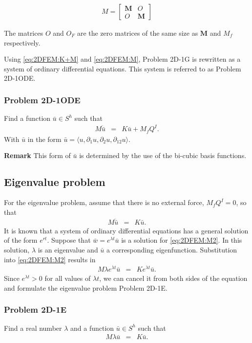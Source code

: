 \documentclass[../../main.tex]{subfiles}
\begin{document}
\begin{eqnarray}
	M = 
	\begin{bmatrix}
		\mathbf{M} & O \\
		O & \mathbf{M}
	\end{bmatrix}\label{eq:2DFEM:M}
\end{eqnarray}

The matrices ${O}$ and ${O_F}$ are the zero matrices of the same size as $\mathbf{M}$ and ${M_f}$ respectively.

Using \eqref{eq:2DFEM:K+M} and \eqref{eq:2DFEM:M}, Problem 2D-1G is rewritten as a system of ordinary differential equations. This system is referred to as Problem 2D-1ODE.

\subsubsection{Problem 2D-1ODE}
Find a function $\bar{u} \in S^h$ such that
\begin{eqnarray}
	M\ddot{\bar{u}} & = & K\bar{u} + M_{f}Q^I.
\end{eqnarray} With $\bar{u}$ in the form $\bar{u} = \langle u, \partial_1 u, \partial_2 u, \partial_{12} u \rangle$.

\textbf{Remark} This form of $\bar{u}$ is determined by the use of the bi-cubic basis functions.

\subsection{Eigenvalue problem}\label{2dFEM_EP}
For the eigenvalue problem, assume that there is no external force, $M_{f}Q^I = 0$, so that 
\begin{eqnarray}
		M\ddot{\bar{u}} & = & K\bar{u}.\label{eq:2DFEM:M2}
\end{eqnarray}
It is known that a system of ordinary differential equations has a general solution of the form $e^{rt}$. Suppose that $\bar{w} = e^{\lambda t} \bar{u}$ is a solution for \eqref{eq:2DFEM:M2}. In this solution, $\lambda$ is an eigenvalue and $\bar{u}$ a corresponding eigenfunction. Substitution into \eqref{eq:2DFEM:M2} results in
\begin{eqnarray*}
	M\lambda e^{\lambda t}\bar{u} & = & Ke^{\lambda t}\bar{u}.
\end{eqnarray*}
Since $e^{\lambda t} > 0$ for all values of $\lambda t$, we can cancel it from both sides of the equation and formulate the eigenvalue problem Problem 2D-1E.

\subsubsection{Problem 2D-1E}
Find a real number $\lambda$ and a function $\bar{u} \in S^h$ such that
\begin{eqnarray}
	M\lambda{\bar{u}} & = & K\bar{u}.
\end{eqnarray}
\end{document}
